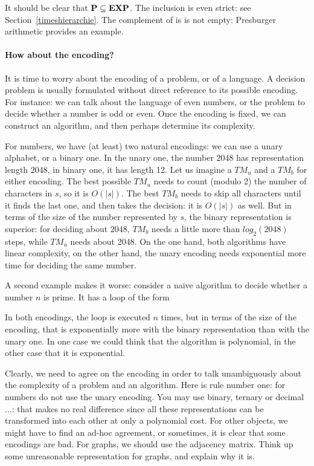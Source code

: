 It should be clear that ${\bf P} \subseteq {\bf EXP}$. The inclusion is even strict: see Section~\ref{timeshierarchie}.
%
The complement of \EXP is is not empty: Presburger arithmetic provides
an example.

\paragraph{How about the encoding?}
It is time to worry about the encoding of a problem, or of a language.
A decision problem is usually formulated without direct reference to
its possible encoding. For instance: we can talk about the language of
even numbers, or the problem to decide whether a number is odd or
even. Once the encoding is fixed, we can construct an algorithm, and
then perhaps determine its complexity.

For numbers, we have (at least) two natural encodings: we can use a
unary alphabet, or a binary one. In the unary one, the number $2048$
has representation length 2048, in binary one, it has length 12. Let
us imagine a $TM_u$ and a $TM_b$ for either encoding. The best
possible $TM_u$ needs to count (modulo 2) the number of characters in
$s$, so it is $O(|s|)$. The best $TM_b$ needs to skip all characters
until it finds the last one, and then takes the decision: it is
$O(|s|)$ as well. But in terms of the size of the number represented
by $s$, the binary representation is superior: for deciding about
$2048$, $TM_b$ needs a little more than $log_2(2048)$ steps, while
$TM_u$ needs about 2048. On the one hand, both algorithms have linear
complexity, on the other hand, the unary encoding needs exponential
more time for deciding the same number.

A second example makes it worse: consider a naive algorithm to decide
whether a number $n$ is prime. It has a loop of the form

\begin{algorithmic}
         \EndIf
    \EndWhile
\end{algorithmic}

In both encodings, the loop is executed $n$ times, but in terms of the
size of the encoding, that is exponentially more with the binary
representation than with the unary one. In one case we could think
that the algorithm is polynomial, in the other case that it is
exponential.

Clearly, we need to agree on the encoding in order to talk
unambiguously about the complexity of a problem and an algorithm. Here
is rule number one: for numbers do not use the unary encoding. You may
use binary, ternary or decimal ...: that makes no real difference
since all these representations can be transformed into each other at
only a polynomial cost. For other objects, we might have to find an
ad-hoc agreement, or sometimes, it is clear that some encodings are
bad. For graphs, we should use the adjacency matrix. Think up some
unreasonable representation for graphs, and explain why it is.


